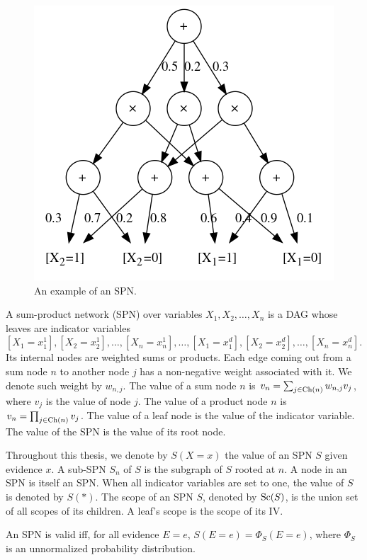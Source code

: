 \begin{figure}[h]
  \centering\includegraphics[scale=0.60]{graphs/sample_spn.png}
  \caption{An example of an SPN.\label{fig:sample_spn}}
\end{figure}

\begin{definition}
  A sum-product network (SPN) over variables $X_1,X_2,\ldots,X_n$ is a DAG whose leaves are
  indicator variables $[X_1=x_1^1],[X_2=x_2^1],\ldots,[X_n=x_n^1],\ldots,[X_1=x_1^d],[X_2=x_2^d],
  \ldots,[X_n=x_n^d]$. Its internal nodes are weighted sums or products. Each edge coming out from
  a sum node $n$ to another node $j$ has a non-negative weight associated with it. We denote such
  weight by $w_{n,j}$. The value of a sum node $n$ is $v_n=\sum_{j\in\operatorname*{\text{Ch}}(n)}w_{n,j}v_j$, where
  $v_j$ is the value of node $j$. The value of a product node $n$ is $v_n=\prod_{j\in\operatorname*{\text{Ch}}(n)}v_j$.
  The value of a leaf node is the value of the indicator variable. The value of the SPN is the
  value of its root node.
\end{definition}

Throughout this thesis, we denote by $S(X=x)$ the value of an SPN $S$ given evidence $x$. A sub-SPN
$S_n$ of $S$ is the subgraph of $S$ rooted at $n$. A node in an SPN is itself an SPN\@. When all
indicator variables are set to one, the value of $S$ is denoted by $S(\ast)$. The scope of an SPN
$S$, denoted by $\operatorname*{\text{Sc}}(S)$, is the union set of all scopes of its children. A leaf's scope is the
scope of its IV\@.

\begin{definition}[Validity]
  An SPN is valid iff, for all evidence $E=e$, $S(E=e)=\Phi_S(E=e)$, where $\Phi_S$ is an
  unnormalized probability distribution.
\end{definition}

